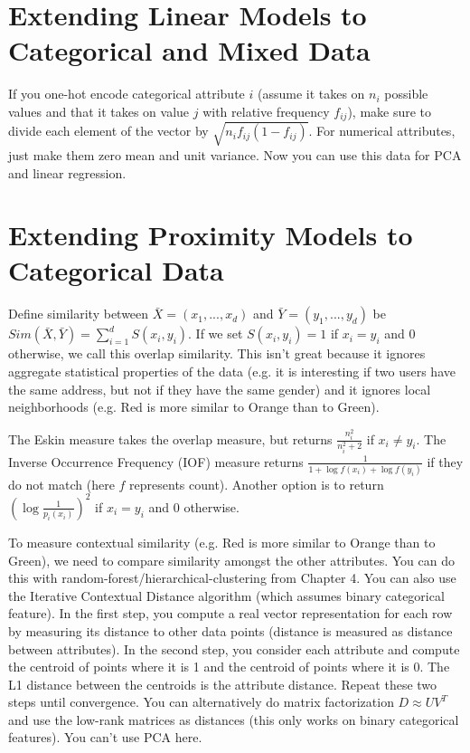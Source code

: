 \documentclass[a4paper]{article}
\begin{document}
\section{Extending Linear Models to Categorical and Mixed Data}
If you one-hot encode categorical attribute $i$ (assume it takes on $n_i$
possible values and that it takes on value $j$ with relative frequency
$f_{ij}$), make sure to divide each element of the vector by $\sqrt{n_i f_{ij}
(1 - f_{ij})}$. For numerical attributes, just make them zero mean and unit
variance. Now you can use this data for PCA and linear regression.

\section{Extending Proximity Models to Categorical Data}
Define similarity between $\bar{X} = (x_1, ..., x_d)$ and $\bar{Y} =
(y_1, ..., y_d)$ be $Sim(\bar{X}, \bar{Y}) = \sum_{i=1}^{d}{S(x_i, y_i)}$.
If we set $S(x_i, y_i) = 1$ if $x_i = y_i$ and $0$ otherwise, we call this
overlap similarity. This isn't great because it ignores aggregate statistical
properties of the data (e.g. it is interesting if two users have the same
address, but not if they have the same gender) and it ignores local
neighborhoods (e.g. Red is more similar to Orange than to Green).

The Eskin measure takes the overlap measure, but returns $\frac{n_i^2}{
n_i^2 + 2}$ if $x_i \ne y_i$. The Inverse Occurrence Frequency (IOF) measure
returns $\frac{1}{1 + \log{f(x_i)} + \log{f(y_i)}}$ if they do not match
(here $f$ represents count). Another option is to return $(\log{\frac{1}{
p_i(x_i)}})^2$ if $x_i = y_i$ and $0$ otherwise.

To measure contextual similarity (e.g. Red is more similar to Orange than
to Green), we need to compare similarity amongst the other attributes. You
can do this with random-forest/hierarchical-clustering from Chapter 4. You
can also use the Iterative Contextual Distance algorithm (which assumes
binary categorical feature). In the first step, you compute a real vector
representation for each row by measuring its distance to other data points
(distance is measured as distance between attributes). In the second step,
you consider each attribute and compute the centroid of points where it is 1
and the centroid of points where it is 0. The L1 distance between the centroids
is the attribute distance. Repeat these two steps until convergence. You
can alternatively do matrix factorization $D \approx UV^T$ and use the low-rank
matrices as distances (this only works on binary categorical features).
You can't use PCA here.
\end{document}
